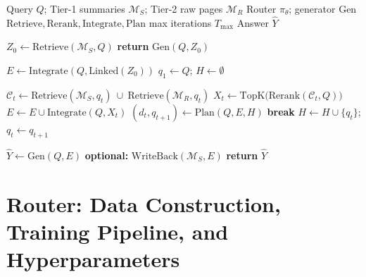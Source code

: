 \documentclass{article}
\theoremstyle{plain}
\theoremstyle{definition}
\theoremstyle{remark}
\newcommand{\Msum}{\mathcal{M}_S}        %
\newcommand{\Mraw}{\mathcal{M}_R}        %
\begin{document}
\begin{algorithm}[t]
\caption{TierMem QA (Abstract): Router + Bounded Retrieve--Integrate--Plan Loop}
\label{alg:TierMem_qa_retrieve_integrate_plan}
\begin{algorithmic}[1] %
\REQUIRE Query $Q$; Tier-1 summaries $\Msum$; Tier-2 raw pages $\Mraw$
\REQUIRE Router $\pi_\theta$; generator $\mathrm{Gen}$
\REQUIRE $\mathrm{Retrieve}, \mathrm{Rerank}, \mathrm{Integrate}, \mathrm{Plan}$
\REQUIRE max iterations $T_{\max}$
\ENSURE Answer $\hat{Y}$

\STATE $Z_0 \gets \mathrm{Retrieve}(\Msum, Q)$
    \STATE \textbf{return} $\mathrm{Gen}(Q, Z_0)$
\ENDIF

\STATE $E \gets \mathrm{Integrate}(Q, \mathrm{Linked}(Z_0))$ 
\STATE $q_1 \gets Q$; $H \gets \emptyset$ 

    \STATE $\mathcal{C}_t \gets \mathrm{Retrieve}(\Msum, q_t)\ \cup\ \mathrm{Retrieve}(\Mraw, q_t)$
    \STATE $X_t \gets \mathrm{TopK}\big(\mathrm{Rerank}(\mathcal{C}_t, Q)\big)$
    \STATE $E \gets E \cup \mathrm{Integrate}(Q, X_t)$ 
    \STATE $(d_t, q_{t+1}) \gets \mathrm{Plan}(Q, E, H)$ 
     \STATE \textbf{break} \ENDIF
    \STATE $H \gets H \cup \{q_t\}$; $q_t \gets q_{t+1}$
\ENDFOR

\STATE $\hat{Y} \gets \mathrm{Gen}(Q, E)$
\STATE \textbf{optional:} $\mathrm{WriteBack}(\Msum, E)$
\STATE \textbf{return} $\hat{Y}$
\end{algorithmic}
\end{algorithm}











\section{Router: Data Construction, Training Pipeline, and Hyperparameters}
\label{app:router_full}
\end{document}
